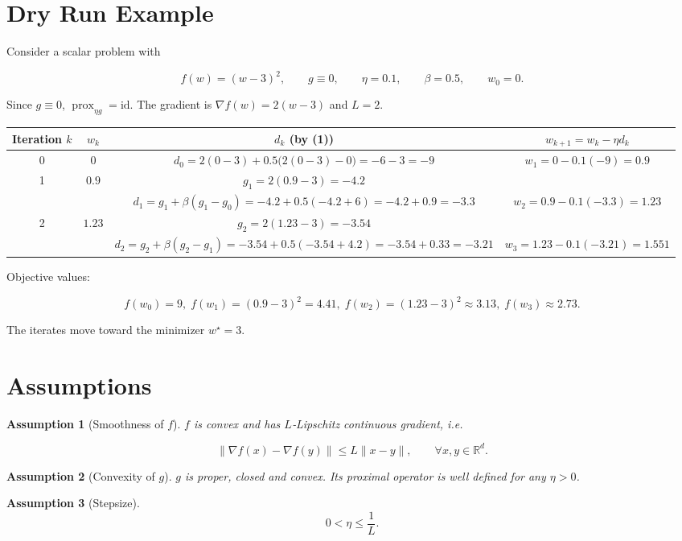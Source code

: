 \documentclass{article}
\newtheorem{assumption}{Assumption}
\begin{document}
\section*{Dry Run Example}
Consider a scalar problem with  

\[
f(w)=(w-3)^2,\qquad g\equiv0,\qquad \eta=0.1,\qquad \beta=0.5,\qquad w_0=0.
\]

Since $g\equiv0$, $\operatorname{prox}_{\eta g}= \text{id}$.  
The gradient is $\nabla f(w)=2(w-3)$ and $L=2$.

\begin{center}
\begin{tabular}{c|c|c|c}
Iteration $k$ & $w_k$ & $d_k$ (by (1)) & $w_{k+1}=w_k-\eta d_k$ \\ \hline
0 & $0$ & $d_0=2(0-3)+0.5\bigl(2(0-3)-0\bigr)=-6-3=-9$ & $w_1=0-0.1(-9)=0.9$ \\[4pt]
1 & $0.9$ & $g_1=2(0.9-3)=-4.2$\\
   &       & $d_1=g_1+\beta(g_1-g_0)=-4.2+0.5(-4.2+6)=-4.2+0.9=-3.3$ & $w_2=0.9-0.1(-3.3)=1.23$ \\[4pt]
2 & $1.23$ & $g_2=2(1.23-3)=-3.54$\\
   &       & $d_2=g_2+\beta(g_2-g_1)=-3.54+0.5(-3.54+4.2)=-3.54+0.33=-3.21$ & $w_3=1.23-0.1(-3.21)=1.551$ 
\end{tabular}
\end{center}

Objective values:  

\[
f(w_0)=9,\;f(w_1)= (0.9-3)^2=4.41,\;f(w_2)= (1.23-3)^2\approx3.13,\;f(w_3)\approx2.73.
\]

The iterates move toward the minimizer $w^\star=3$.

\newpage
\section*{Assumptions}
\begin{assumption}[Smoothness of $f$]
$f$ is convex and has $L$‑Lipschitz continuous gradient, i.e.  

\[
\|\nabla f(x)-\nabla f(y)\|\le L\|x-y\|,\qquad\forall x,y\in\mathbb{R}^d. \tag{A1}
\]
\end{assumption}

\begin{assumption}[Convexity of $g$]
$g$ is proper, closed and convex. Its proximal operator is well defined for any $\eta>0$. 
\end{assumption}

\begin{assumption}[Stepsize]
\[
0<\eta\le\frac{1}{L}. \tag{A3}
\]
\end{assumption}
\end{document}
